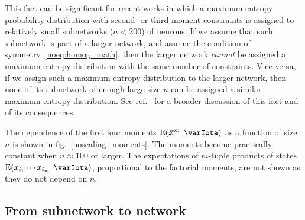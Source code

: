 \documentclass{article}
\theoremstyle{remark}
\theoremstyle{innote}
\newcommand*{\citep}{\parencites}
\renewcommand*{\|}{\mathpunct{|}}%
\newcommand*{\fig}{fig.}%
\newcommand*{\eg}{{e.g.}}
\newcommand*{\E}{\mathrm{E}}
\DeclarePairedDelimiter\expp{(}{)}
\newcommand*{\expe}{\E\expp}%
\theoremstyle{simple}
\newcommand*{\widebar}[1]{{\mkern1.5mu\skew{2}\overline{\mkern-1.5mu#1\mkern-1.5mu}\mkern 1.5mu}}
\newcommand*{\sav}{\widebar} %
\newcommand*{\yxx}{x}%
\newcommand*{\yx}{\bm{\yxx}}%
\newcommand*{\yxs}{\sav{\yx}}%
\newcommand*{\yH}{\varIota}
\begin{document}
This fact can be significant for recent works
\citep[\eg,][]{schneidmanetal2006,shlensetal2006,tkaciketal2006,marreetal2009,tkaciketal2009,ganmoretal2011,shimazakietal2012,tkaciketal2013,shimazakietal2015}
in which a maximum-entropy probability distribution with second- or
third-moment constraints is assigned to relatively small subnetworks
($n < 200$) of neurons. If we assume that such subnetwork is part of a
larger network, and assume the condition of symmetry~\eqref{noeq:homog_math},
then the larger network \emph{cannot} be assigned a maximum-entropy
distribution with the same number of constraints. Vice versa, if we assign
such a maximum-entropy distribution to the larger network, then none of its
subnetwork of enough large size $n$ can be assigned a similar
maximum-entropy distribution. See ref.~\citep{rostamietal2016_r2017} for a
broader discussion of this fact and of its consequences.

\medskip

The dependence of the first four moments $\expe{\yxs^m \| \yH}$ as a
function of size $n$ is shown in \fig~\ref{noscaling_moments}. The moments
become practically constant when $n \approx 100$ or larger. The
expectations of $m$-tuple products of states
$\expe{x_{i_1}\dotsm x_{i_m} \| \yH}$, proportional to the factorial
moments, are not shown as they do not depend on $n$.


\subsection{From subnetwork to network}
\label{nosec:from_sub_to_full}
\end{document}
